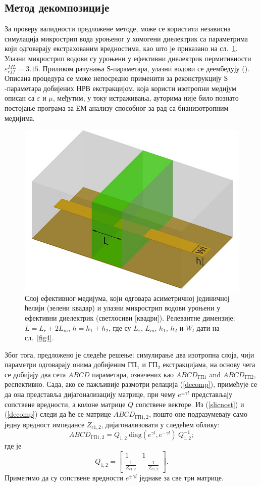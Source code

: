 \documentclass[main.tex]{subfiles}
\begin{document}
\subsection{Метод декомпозиције}
За проверу валидности предложене методе, може се користити независна симулација микрострип вода уроњеног у хомогени диелектрик са параметрима који одговарају екстрахованим вредностима, као што је приказано на сл.~\ref{slab}. Улазни микрострип водови су уроњени у ефективни диелектрик пермитивности $\varepsilon^{ML}_{eff}=\num{3.15}$. Приликом рачунања $Ѕ$-параметара, улазни водови се деембедују (). Описана процедура се може непосредно применити за реконструкцију $Ѕ$-параметара добијених НРВ екстракцијом, која користи изотропни медијум описан са $\varepsilon$ и $\mu$, међутим, у току истраживања, ауторима није било познато постојање програма за ЕМ анализу способног за рад са бианизотропним медијима.
\begin{figure}[!t]
\centering
\includegraphics[width=0.6\columnwidth]{slike/slab.jpeg}
\caption{Слој ефективног медијума, који одговара асиметричној јединичној ћелији (зелени квадар) и улазни микрострип водови уроњени у ефективни диелектрик (светлосиви [квадри]). Релевантне димензије: $L=L_r+2L_m$, $h=h_1+h_2$, где су $L_r$, $L_m$, $h_1$, $h_2$ и $W_l$ дати на сл.~\ref{fig4}.}
\label{slab}
\end{figure}

Због тога, предложено је следеће решење: симулирање два изотропна слоја, чији параметри одговарају онима добијеним $ГП_1$ и $ГП_2$ екстракцијама, на основу чега се добијају два сета $ABCD$ параметара, означених као $ABCD_{ГП1}$ and $ABCD_{ГП2}$, респективно. Сада, ако се пажљивије размотри релација (\ref{decomp}), примећује се да она представља дијагонализацију матрице, при чему $e^{\pm \gamma l}$ представљају сопствене вредности, а колоне матрице $Q$ сопствене векторе. Из (\ref{slicnost}) и (\ref{decomp}) следи да ће се матрице $ABCD_{ГП1,2}$, пошто оне подразумевају само једну вредност импедансе $Z_{c1,2}$, дијагонализовати у следећем облику:
\begin{equation}\label{decomp2}
ABCD_{ГП1,2} = Q_{1,2}\: \mathrm{diag}(e^{\gamma l},e^{-\gamma l})\: Q_{1,2}^{-1};
\end{equation}
где је
\begin{equation}
Q_{1,2} = 
\begin{bmatrix}
1 & 1 \\
\frac{1}{Z_{c1,2}} & -\frac{1}{Z_{c1,2}}
\end{bmatrix}.
\end{equation}
Приметимо да су сопствене вредности $e^{\pm \gamma l}$ једнаке за све три матрице.
\end{document}
